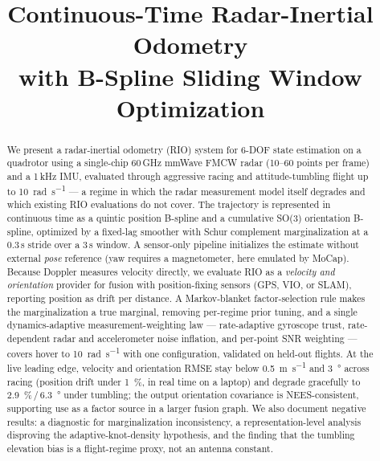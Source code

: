 \documentclass[conference]{IEEEtran}
\begin{document}
\title{Continuous-Time Radar-Inertial Odometry\\with B-Spline Sliding Window Optimization}

\author{
}

\maketitle

\begin{abstract}
We present a radar-inertial odometry (RIO) system for 6-DOF state
estimation on a quadrotor using a single-chip 60\,GHz mmWave FMCW
radar (10--60 points per frame) and a 1\,kHz IMU, evaluated through
aggressive racing and attitude-tumbling flight up to
\SI{10}{\radian\per\second} --- a regime in which the radar
measurement model itself degrades and which existing RIO evaluations
do not cover.  The trajectory is represented in continuous time as a
quintic position B-spline and a cumulative SO(3) orientation B-spline,
optimized by a fixed-lag smoother with Schur complement marginalization
at a 0.3\,s stride over a 3\,s window.  A sensor-only pipeline
initializes the estimate without external \emph{pose} reference (yaw
requires a magnetometer, here emulated by MoCap).  Because Doppler
measures velocity directly, we evaluate RIO as a \emph{velocity and
orientation} provider for fusion with position-fixing sensors (GPS,
VIO, or SLAM), reporting position as drift per distance.  A
Markov-blanket factor-selection rule makes the marginalization a true
marginal, removing per-regime prior tuning, and a single
dynamics-adaptive measurement-weighting law --- rate-adaptive gyroscope
trust, rate-dependent radar and accelerometer noise inflation, and
per-point SNR weighting --- covers hover to \SI{10}{\radian\per\second}
with one configuration, validated on held-out flights.  At the live
leading edge, velocity and orientation RMSE stay below
\SI{0.5}{\metre\per\second} and \SI{3}{\degree} across racing (position
drift under \SI{1}{\percent}, in real time on a laptop) and degrade
gracefully to \SI{2.9}{\percent}\,/\,\SI{6.3}{\degree} under tumbling;
the output orientation covariance is NEES-consistent, supporting use as
a factor source in a larger fusion graph.  We also document negative
results: a diagnostic for marginalization inconsistency, a
representation-level analysis disproving the adaptive-knot-density
hypothesis, and the finding that the tumbling elevation bias is a
flight-regime proxy, not an antenna constant.
\end{abstract}
\end{document}
